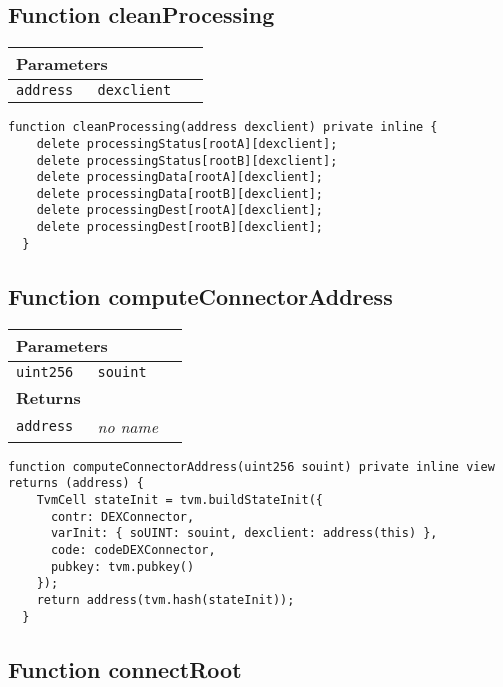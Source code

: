 \subsection{Function cleanProcessing}


\ifsoltables
\noindent\begin{tabular}{|l|l|p{5cm}|}\hline
\multicolumn{3}{|l|}{\bf Parameters}\\\hline
\tt address & \tt dexclient &\\\hline
\end{tabular}
\fi

\vspace{2cm}

\begin{lstlisting}[firstnumber=232]
  function cleanProcessing(address dexclient) private inline {
    delete processingStatus[rootA][dexclient];
    delete processingStatus[rootB][dexclient];
    delete processingData[rootA][dexclient];
    delete processingData[rootB][dexclient];
    delete processingDest[rootA][dexclient];
    delete processingDest[rootB][dexclient];
  }
\end{lstlisting}

\subsection{Function computeConnectorAddress}


\ifsoltables
\noindent\begin{tabular}{|l|l|p{5cm}|}\hline
\multicolumn{3}{|l|}{\bf Parameters}\\\hline
\tt uint256 & \tt souint &\\\hline
\multicolumn{3}{|l|}{\bf Returns}\\\hline
\tt address & {\em no name} &\\\hline
\end{tabular}
\fi

\vspace{2cm}

\begin{lstlisting}[firstnumber=95]
  function computeConnectorAddress(uint256 souint) private inline view returns (address) {
    TvmCell stateInit = tvm.buildStateInit({
      contr: DEXConnector,
      varInit: { soUINT: souint, dexclient: address(this) },
      code: codeDEXConnector,
      pubkey: tvm.pubkey()
    });
    return address(tvm.hash(stateInit));
  }
\end{lstlisting}

\subsection{Function connectRoot}


